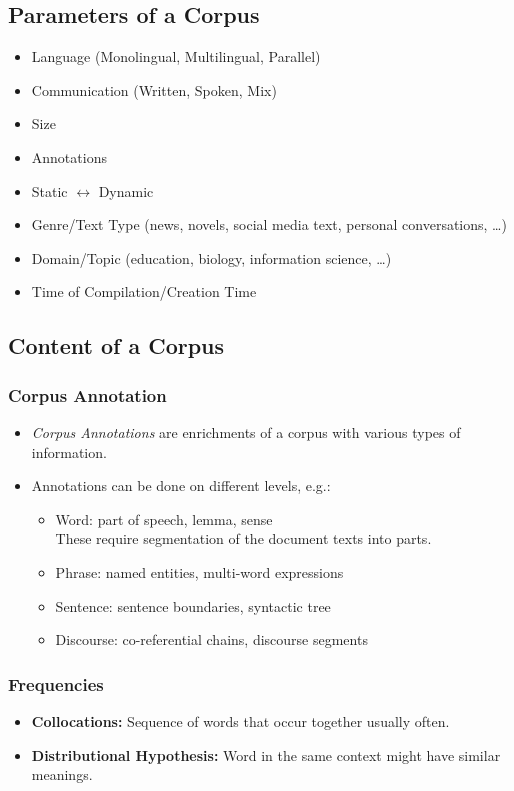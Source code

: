 	\subsection{Parameters of a Corpus} %
		\begin{itemize}
			\item Language (Monolingual, Multilingual, Parallel)
			\item Communication (Written, Spoken, Mix)
			\item Size
			\item Annotations
			\item Static \(\leftrightarrow\) Dynamic
			\item Genre/Text Type (news, novels, social media text, personal conversations, \dots)
			\item Domain/Topic (education, biology, information science, \dots)
			\item Time of Compilation/Creation Time
		\end{itemize}

	\subsection{Content of a Corpus} %
		\subsubsection{Corpus Annotation} %
			\begin{itemize}
				\item \textit{Corpus Annotations} are enrichments of a corpus with various types of information.
				\item Annotations can be done on different levels, e.g.:
					\begin{itemize}
						\item Word: part of speech, lemma, sense \\ These require segmentation of the document texts into parts.
						\item Phrase: named entities, multi-word expressions
						\item Sentence: sentence boundaries, syntactic tree
						\item Discourse: co-referential chains, discourse segments
					\end{itemize}
			\end{itemize}

		\subsubsection{Frequencies} %
			\begin{itemize}
				\item \textbf{Collocations:} Sequence of words that occur together usually often.
				\item \textbf{Distributional Hypothesis:} Word in the same context might have similar meanings.
			\end{itemize}

